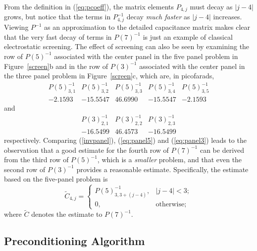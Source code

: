 From the definition in (\ref{eq:pcoeff}), the matrix elements $
P_{4,j} $ must decay as $ | j - 4 | $ grows, but notice that the terms
in $ P^{-1}_{4,j} $ decay {\it much faster} as $ | j - 4 | $
increases.  Viewing $ P^{-1} $ as an approximation to the detailed
capacitance matrix makes clear that the very fast decay of terms in $
P(7)^{-1} $ is just an example of classical electrostatic screening.  The
effect of screening can also be seen by examining the row of $ P(5)^{-1}
$ associated with the center panel in the five panel problem in 
Figure~\ref{screen}b and in the row of $ P(3)^{-1} $ associated with the center
panel in the three panel problem in Figure~\ref{screen}c, which
are, in picofarads,
\begin{equation}
\begin{array}{ccccc}
P(5)^{-1}_{3,1} & P(5)^{-1}_{3,2} & P(5)^{-1}_{3,3} & 
P(5)^{-1}_{3,4} & P(5)^{-1}_{3,5} \\
   -2.1593 & -15.5547 &  46.6990 & -15.5547  & -2.1593
\end{array}
\label{eq:panel5}
\end{equation}
and
\begin{equation}
\begin{array}{ccc}
P(3)^{-1}_{2,1} & P(3)^{-1}_{2,2} & P(3)^{-1}_{2,3} \\
  -16.5499 &  46.4573 & -16.5499 
\end{array}
\label{eq:panel3}
\end{equation}
respectively.  Comparing (\ref{invpanel}), (\ref{eq:panel5}) and
(\ref{eq:panel3}) leads to the observation that a good estimate for
the fourth row of $P(7)^{-1} $ can be
derived from the third row of $ P(5)^{-1} $, which is a {\it smaller}
problem, and that even the second row of $ P(3)^{-1} $
provides a reasonable estimate.  Specifically,
the estimate based on the five-panel problem is
\begin{equation}
\tilde{C}_{4,j} = \left\{
\begin{array}{ll}
P(5)^{-1}_{3,3 + (j - 4)}, & |j - 4| <  3;\\
0, & \mbox{otherwise};
\end{array}
\right.
\label{eq:est5}
\end{equation}
where $ \tilde{C} $ denotes the estimate to $ P(7)^{-1} $.

\subsection{Preconditioning Algorithm}

